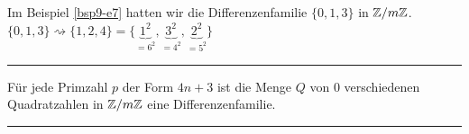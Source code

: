 \documentclass[9pt]{article}
\begin{document}
Im Beispiel \ref{bsp9-e7} hatten wir die Differenzenfamilie $\{0,1,3\}$ in $\mathbb{Z} / m \mathbb{Z}$.  \\
$\{0,1,3\} \rightsquigarrow \{1,2,4\} = \{\underbrace{1^2}_{=6^2}, \underbrace{3^2}_{=4^2}, \underbrace{2^2}_{=5^2}\}$ \\ \newline
 \noindent \rule{8cm}{0.4pt} 
\begin{satz}
 Für jede Primzahl $p$ der Form $4n+3$ ist die Menge $Q$ von 0 verschiedenen Quadratzahlen in $\mathbb{Z} / m \mathbb{Z}$ eine Differenzenfamilie. \\ \newline
{}
 \end{satz} \noindent \rule{8cm}{0.4pt}
\end{document}
